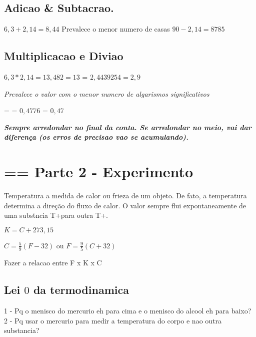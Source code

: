 \documentclass[a4paper,12pt]{article}
\begin{document}
\subsection {Adicao & Subtacrao.}
$6,3 + 2,14 = 8,44$
Prevalece o menor numero de casas \longrightarrow $90 - 2,14 = 8785$
\subsection{Multiplicacao e Diviao}
$6,3 * 2,14 = 13,482 = 13$
 = $2,4439254 = 2,9$

\textit{Prevalece o valor com o menor numero de algarismos significativos}

 =  = $0,4776$ = $0,47$

\textit{\textbf{Sempre arredondar no final da conta. Se arredondar no meio, vai dar diferença (os erros de precisao vao se acumulando).}}

\section{== Parte 2 - Experimento}
Temperatura  a medida de calor ou frieza de um objeto. De fato, a temperatura determina a direção do fluxo de calor. O valor sempre flui expontaneamente de uma substncia T+\uparrow para outra T+\downarrow.

$K = C + 273,15$

$C = \frac{5}{9}(F - 32)$
ou
$F = \frac{9}{5}(C + 32)$

Fazer a relacao entre F x K x C

\subsection{Lei $0$ da termodinamica}


1 - Pq o menisco do mercurio eh para cima e o menisco do alcool eh para baixo?
2 - Pq usar o mercurio para medir a temperatura do corpo e nao outra substancia?
\end{document}
